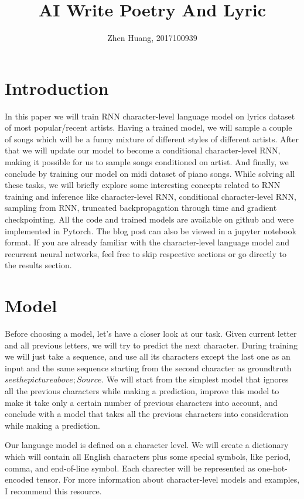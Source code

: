 \documentclass{article}
\title{AI Write Poetry And Lyric}
\author[1]{Zhen Huang, 2017100939}
\begin{document}
\maketitle
\section{Introduction}
In this paper we will train RNN character-level language model on lyrics dataset of most popular/recent artists. Having a trained model, we will sample a couple of songs which will be a funny mixture of different styles of different artists. After that we will update our model to become a conditional character-level RNN, making it possible for us to sample songs conditioned on artist. And finally, we conclude by training our model on midi dataset of piano songs. While solving all these tasks, we will briefly explore some interesting concepts related to RNN training and inference like character-level RNN, conditional character-level RNN, sampling from RNN, truncated backpropagation through time and gradient checkpointing. All the code and trained models are available on github and were implemented in Pytorch. The blog post can also be viewed in a jupyter notebook format. If you are already familiar with the character-level language model and recurrent neural networks, feel free to skip respective sections or go directly to the results section.
\section{Model}
Before choosing a model, let’s have a closer look at our task. Given current letter and all previous letters, we will try to predict the next character. During training we will just take a sequence, and use all its characters except the last one as an input and the same sequence starting from the second character as groundtruth \(see the picture above; Source\). We will start from the simplest model that ignores all the previous characters while making a prediction, improve this model to make it take only a certain number of previous characters into account, and conclude with a model that takes all the previous characters into consideration while making a prediction.

Our language model is defined on a character level. We will create a dictionary which will contain all English characters plus some special symbols, like period, comma, and end-of-line symbol. Each charecter will be represented as one-hot-encoded tensor. For more information about character-level models and examples, I recommend this resource.
\end{document}
